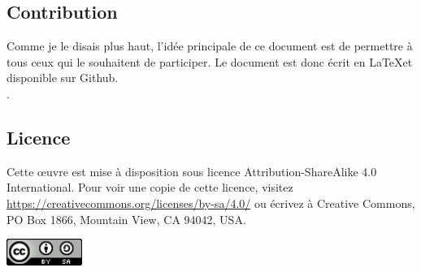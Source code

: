 \subsection{Contribution}
Comme je le disais plus haut, l’idée principale de ce document est de permettre à tous ceux qui le souhaitent de participer. Le document est donc écrit en \LaTeX et disponible sur Github.\\
\cite{website:jdrp-starwars-reloaded}.

\subsection{Licence}
Cette \oe{uvre} est mise à disposition sous licence Attribution-ShareAlike 4.0 International. Pour voir une copie de cette licence, visitez \url{https://creativecommons.org/licenses/by-sa/4.0/} ou écrivez à Creative Commons, PO Box 1866, Mountain View, CA 94042, USA.

\begin{flushright}
	\includegraphics[width=70pt]{img/cc-by-sa.png}
\end{flushright}

\twocolumn